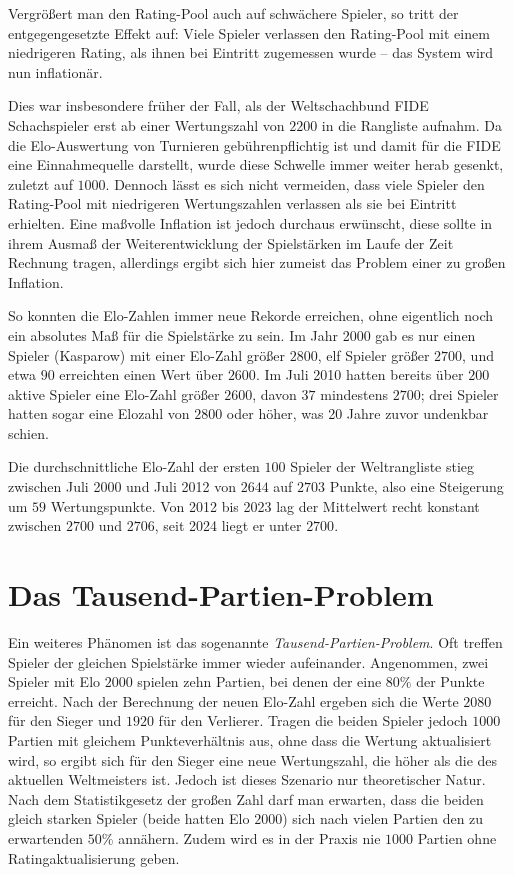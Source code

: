 Vergrößert man den Rating-Pool auch auf schwächere Spieler, so tritt der entgegengesetzte Effekt auf: Viele Spieler verlassen den Rating-Pool mit einem niedrigeren Rating, als ihnen bei Eintritt zugemessen wurde -- das System wird nun inflationär.

Dies war insbesondere früher der Fall, als der Weltschachbund FIDE Schachspieler erst ab einer Wertungszahl von $2200$ in die Rangliste aufnahm. Da die Elo-Auswertung von Turnieren gebührenpflichtig ist und damit für die FIDE eine Einnahmequelle darstellt, wurde diese Schwelle immer weiter herab gesenkt, zuletzt auf $1000$. Dennoch lässt es sich nicht vermeiden, dass viele Spieler den Rating-Pool mit niedrigeren Wertungszahlen verlassen als sie bei Eintritt erhielten. Eine maßvolle Inflation ist jedoch durchaus erwünscht, diese sollte in ihrem Ausmaß der Weiterentwicklung der Spielstärken im Laufe der Zeit Rechnung tragen, allerdings ergibt sich hier zumeist das Problem einer zu großen Inflation.

So konnten die Elo-Zahlen immer neue Rekorde erreichen, ohne eigentlich noch ein absolutes Maß für die Spielstärke zu sein. Im Jahr 2000 gab es nur einen Spieler (Kasparow) mit einer Elo-Zahl größer $2800$, elf Spieler größer $2700$, und etwa $90$ erreichten einen Wert über $2600$. Im Juli 2010 hatten bereits über $200$ aktive Spieler eine Elo-Zahl größer $2600$, davon $37$ mindestens $2700$; drei Spieler hatten sogar eine Elozahl von $2800$ oder höher, was 20 Jahre zuvor undenkbar schien.

Die durchschnittliche Elo-Zahl der ersten $100$ Spieler der Weltrangliste stieg zwischen Juli 2000 und Juli 2012 von $2644$ auf $2703$ Punkte, also eine Steigerung um $59$ Wertungspunkte. Von 2012 bis 2023 lag der Mittelwert recht konstant zwischen $2700$ und $2706$, seit 2024 liegt er unter $2700$. \cite{reddit2023} \cite{fide2026}


\section{Das Tausend-Partien-Problem}

Ein weiteres Phänomen ist das sogenannte \textit{Tausend-Partien-Problem}. Oft treffen Spieler der gleichen Spielstärke immer wieder aufeinander. Angenommen, zwei Spieler mit Elo $2000$ spielen zehn Partien, bei denen der eine $80 \%$ der Punkte erreicht. Nach der Berechnung der neuen Elo-Zahl ergeben sich die Werte $2080$ für den Sieger und $1920$ für den Verlierer. Tragen die beiden Spieler jedoch $1000$ Partien mit gleichem Punkteverhältnis aus, ohne dass die Wertung aktualisiert wird, so ergibt sich für den Sieger eine neue Wertungszahl, die höher als die des aktuellen Weltmeisters ist. Jedoch ist dieses Szenario nur theoretischer Natur. Nach dem Statistikgesetz der großen Zahl darf man erwarten, dass die beiden gleich starken Spieler (beide hatten Elo $2000$) sich nach vielen Partien den zu erwartenden $50 \%$ annähern. Zudem wird es in der Praxis nie $1000$ Partien ohne Ratingaktualisierung geben.

